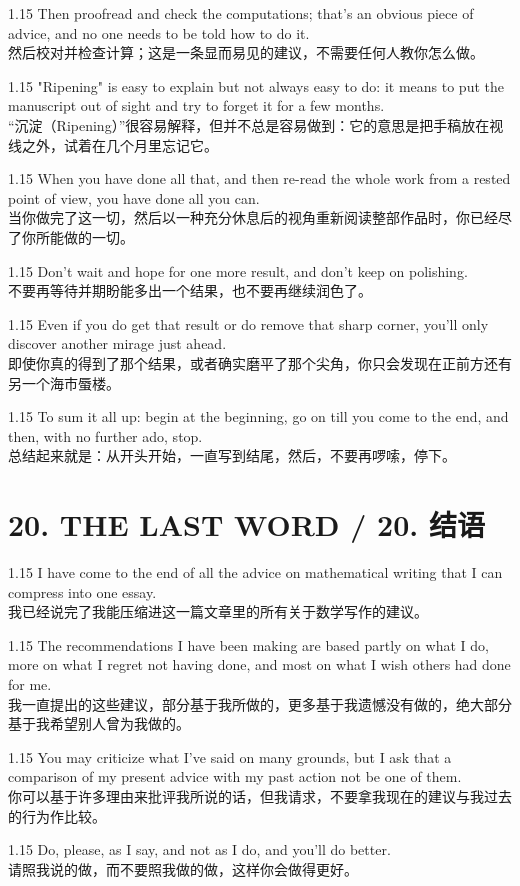 \documentclass[12pt,a4paper]{article}
\newcommand{\bilingual}[2]{
    \begin{spacing}{1.15} %
        \noindent \normalsize #1 \\[-0.5ex] %
        \small \textcolor{blue!70!black}{#2} %
    \end{spacing}
    \vspace{0.8em} %
}
\begin{document}
\bilingual{Then proofread and check the computations; that's an obvious piece of advice, and no one needs to be told how to do it.}
{然后校对并检查计算；这是一条显而易见的建议，不需要任何人教你怎么做。} %

\bilingual{"Ripening" is easy to explain but not always easy to do: it means to put the manuscript out of sight and try to forget it for a few months.}
{“沉淀（Ripening）”很容易解释，但并不总是容易做到：它的意思是把手稿放在视线之外，试着在几个月里忘记它。} %

\bilingual{When you have done all that, and then re-read the whole work from a rested point of view, you have done all you can.}
{当你做完了这一切，然后以一种充分休息后的视角重新阅读整部作品时，你已经尽了你所能做的一切。} %

\bilingual{Don't wait and hope for one more result, and don't keep on polishing.}
{不要再等待并期盼能多出一个结果，也不要再继续润色了。} %

\bilingual{Even if you do get that result or do remove that sharp corner, you'll only discover another mirage just ahead.}
{即使你真的得到了那个结果，或者确实磨平了那个尖角，你只会发现在正前方还有另一个海市蜃楼。} %

\bilingual{To sum it all up: begin at the beginning, go on till you come to the end, and then, with no further ado, stop.}
{总结起来就是：从开头开始，一直写到结尾，然后，不要再啰嗦，停下。} %
\section*{20. THE LAST WORD / 20. 结语} %

\bilingual{I have come to the end of all the advice on mathematical writing that I can compress into one essay.}
{我已经说完了我能压缩进这一篇文章里的所有关于数学写作的建议。} %

\bilingual{The recommendations I have been making are based partly on what I do, more on what I regret not having done, and most on what I wish others had done for me.}
{我一直提出的这些建议，部分基于我所做的，更多基于我遗憾没有做的，绝大部分基于我希望别人曾为我做的。} %

\bilingual{You may criticize what I've said on many grounds, but I ask that a comparison of my present advice with my past action not be one of them.}
{你可以基于许多理由来批评我所说的话，但我请求，不要拿我现在的建议与我过去的行为作比较。} %

\bilingual{Do, please, as I say, and not as I do, and you'll do better.}
{请照我说的做，而不要照我做的做，这样你会做得更好。} %
\end{document}
